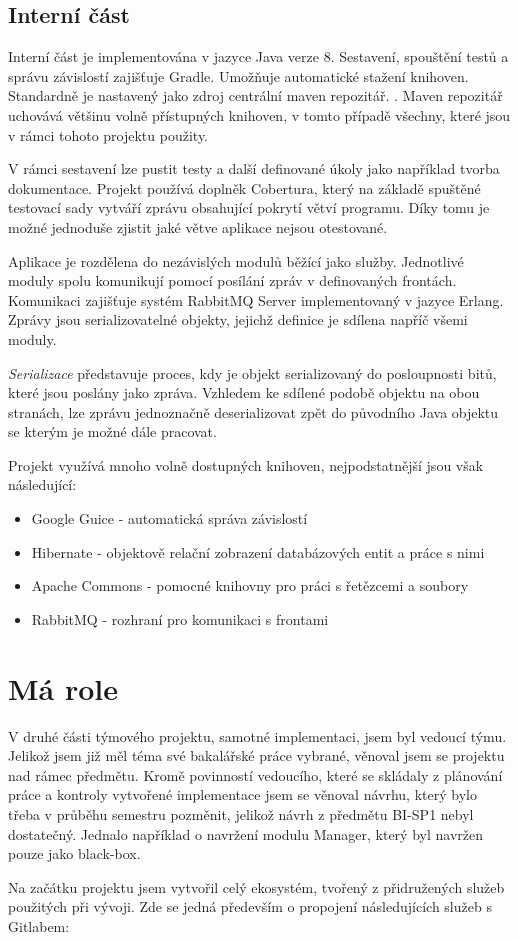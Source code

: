 \documentclass[thesis=B,czech]{FITthesis}[2012/06/26]
\begin{document}
\subsection{Interní část}
Interní část je implementována v jazyce Java verze 8. Sestavení, spouštění testů a správu závislostí zajišťuje Gradle\cite{gradle}.
Umožňuje automatické stažení knihoven. Standardně je nastavený jako zdroj
centrální maven repozitář. \cite{mavenRepo}. Maven repozitář uchovává většinu volně přístupných knihoven, v tomto případě všechny, které jsou v rámci tohoto projektu použity.
\par
V rámci sestavení lze pustit testy a další definované úkoly jako například tvorba dokumentace. Projekt používá
doplněk Cobertura\cite{cobertura}, který na základě spuštěné testovací sady vytváří zprávu obsahující pokrytí větví programu.
Díky tomu je možné jednoduše zjistit jaké větve aplikace nejsou otestované.
\par
Aplikace je rozdělena do nezávislých modulů běžící jako služby. Jednotlivé moduly spolu komunikují
pomocí posílání zpráv v definovaných frontách. Komunikaci zajišťuje systém RabbitMQ Server\cite{rabbitMQ} implementovaný v jazyce Erlang. Zprávy jsou serializovatelné objekty, jejichž definice je sdílena napříč všemi moduly.
\par
\textit{Serializace} představuje proces, kdy je objekt serializovaný do posloupnosti bitů, které jsou poslány jako zpráva. 
Vzhledem ke sdílené podobě objektu na obou stranách, lze zprávu jednoznačně deserializovat zpět do původního Java objektu se kterým
je možné dále pracovat.\cite{serialization}
\par
Projekt využívá mnoho volně dostupných knihoven, nejpodstatnější jsou však následující:
\begin{itemize}
\item Google Guice - automatická správa závislostí \cite{guice}
\item Hibernate - objektově relační zobrazení databázových entit a práce s nimi \cite{hibernate}
\item Apache Commons - pomocné knihovny pro práci s řetězcemi a soubory \cite{commons}
\item RabbitMQ - rozhraní pro komunikaci s frontami \cite{rabbitMQ}
\end{itemize}

\section{Má role}
V druhé části týmového projektu, samotné implementaci, jsem byl vedoucí týmu. Jelikož jsem již měl téma své bakalářské práce vybrané, 
věnoval jsem se projektu nad rámec předmětu. Kromě povinností vedoucího, které se skládaly z plánování práce a kontroly vytvořené implementace
jsem se věnoval návrhu, který bylo třeba v průběhu semestru pozměnit, jelikož návrh z předmětu BI-SP1 nebyl dostatečný. Jednalo například
o navržení modulu Manager, který byl navržen pouze jako black-box.
\par
Na začátku projektu jsem vytvořil celý ekosystém, tvořený z přidružených služeb použitých při vývoji.
Zde se jedná především o propojení následujících služeb s Gitlabem:
\end{document}
